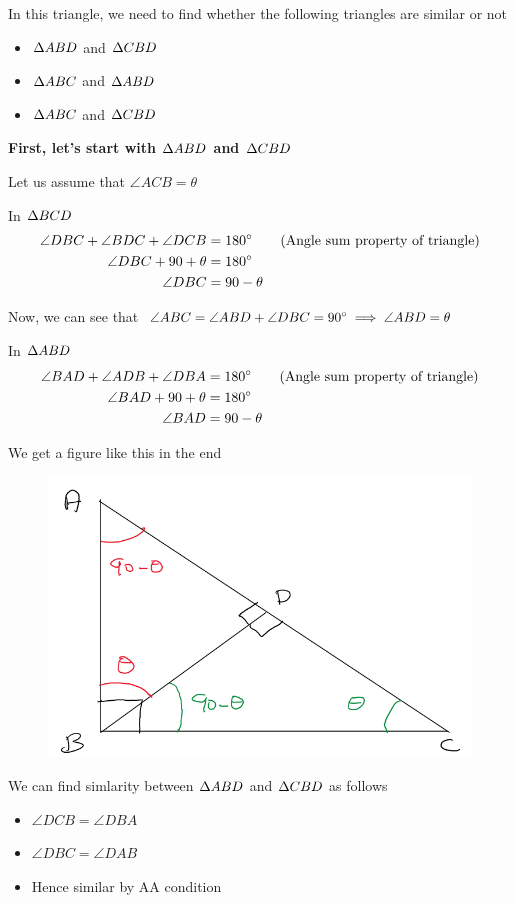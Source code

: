 In this triangle, we need to find whether the following triangles are similar or not

\begin{itemize}
    \item $\Delta {ABD}$ and $\Delta {CBD}$
    \item $\Delta {ABC}$ and $\Delta {ABD}$
    \item $\Delta {ABC}$ and $\Delta {CBD}$
\end{itemize}

\textbf{ First, let's start with $\Delta {ABD}$ and $\Delta {CBD}$ }

Let us assume that $\angle{ACB} = \theta$

In $\Delta {BCD}$
\begin{align*}
    \angle{DBC} + \angle{BDC} + \angle{DCB} &= {180}^{\circ} \tag{Angle sum property of triangle} \\
    \angle{DBC} + 90 + \theta &= {180}^{\circ} \\
    \angle{DBC} &= 90 - \theta
\end{align*}

Now, we can see that $\angle{ABC} = \angle{ABD} + \angle{DBC} = {90}^{\circ} \implies \angle{ABD} = \theta$

In $\Delta {ABD}$
\begin{align*}
    \angle{BAD} + \angle{ADB} + \angle{DBA} &= {180}^{\circ} \tag{Angle sum property of triangle} \\
    \angle{BAD} + 90 + \theta &= {180}^{\circ} \\
    \angle{BAD} &= 90 - \theta
\end{align*}

We get a figure like this in the end

\begin{figure}[h!]
    \centering
    \includegraphics[width=0.5\linewidth]{Quant//Geometry//Images//Triangles/rodha_triangle_6_similarity_equation_case_2_2.png}
\end{figure}

We can find simlarity between $\Delta {ABD}$ and $\Delta {CBD}$ as follows
\begin{itemize}
    \item $\angle{DCB} = \angle{DBA}$
    \item $\angle{DBC} = \angle{DAB}$
    \item Hence similar by AA condition
\end{itemize}

